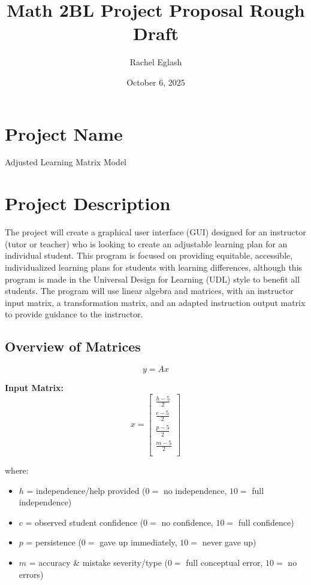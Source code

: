 \documentclass{article}
\title{Math 2BL Project Proposal Rough Draft}
\author{Rachel Eglash}
\date{October 6, 2025}
\begin{document}
\maketitle

\section{Project Name}
    Adjusted Learning Matrix Model

\section{Project Description}
    The project will create a graphical user interface (GUI) designed for an instructor (tutor or teacher) who is looking to create an adjustable learning plan for an individual student. This program is focused on providing equitable, accessible, individualized learning plans for students with learning differences, although this program is made in the Universal Design for Learning (UDL) style to benefit all students. The program will use linear algebra and matrices, with an instructor input matrix, a transformation matrix, and an adapted instruction output matrix to provide guidance to the instructor.

    \subsection{Overview of Matrices}

        \[
            y = Ax
        \]

        \textbf{Input Matrix:}
        \[
            x = \begin{bmatrix}
            \frac{h-5}{2} \\
            \frac{c-5}{2} \\
            \frac{p-5}{2} \\
            \frac{m-5}{2} \\
            \end{bmatrix}
        \]

       where:
            \begin{itemize}
               \item $h$ = independence/help provided ($0 = $ no independence, $10 = $ full independence)
               \item $c$ = observed student confidence ($0 = $ no confidence, $10 = $ full confidence)
               \item $p$ = persistence ($0 = $ gave up immediately, $10 = $ never gave up)
                \item $m$ = accuracy \& mistake severity/type ($0 = $ full conceptual error, $10 = $ no errors)
           \end{itemize}
\end{document}
